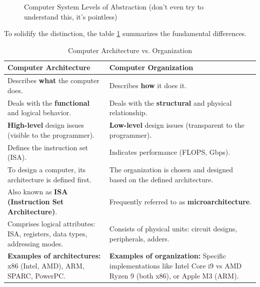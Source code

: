 \begin{figure}[h!]
    \caption{Computer System Levels of Abstraction (don't even try to understand this, it's pointless)}
    \label{fig:computer_levels}
\end{figure}

To solidify the distinction, the table \ref{tab:arq_vs_org} summarizes the fundamental differences.

\begin{table}[h!]
    \centering
    \caption{Computer Architecture vs. Organization}
    \label{tab:arq_vs_org}
    \begin{tabular}{|p{}|p{}|}
        \hline
        \textbf{Computer Architecture} & \textbf{Computer Organization} \\
        \hline
        Describes \textbf{what} the computer does. & Describes \textbf{how} it does it. \\
        \hline
        Deals with the \textbf{functional} and logical behavior. & Deals with the \textbf{structural} and physical relationship. \\
        \hline
        \textbf{High-level} design issues (visible to the programmer). & \textbf{Low-level} design issues (transparent to the programmer). \\
        \hline
        Defines the instruction set (ISA). & Indicates performance (FLOPS, Gbps). \\
        \hline
        To design a computer, its architecture is defined first. & The organization is chosen and designed based on the defined architecture. \\
        \hline
        Also known as \textbf{ISA (Instruction Set Architecture)}. & Frequently referred to as \textbf{microarchitecture}. \\
        \hline
        Comprises logical attributes: ISA, registers, data types, addressing modes. & Consists of physical units: circuit designs, peripherals, adders. \\
        \hline
        \textbf{Examples of architectures:} x86 (Intel, AMD), ARM, SPARC, PowerPC. & \textbf{Examples of organization:} Specific implementations like Intel Core i9 vs AMD Ryzen 9 (both x86), or Apple M3 (ARM). \\
        \hline
    \end{tabular}
\end{table}

